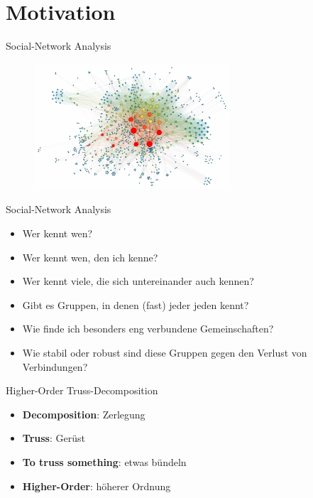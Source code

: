 \section*{Motivation}

\begin{frame}{Social-Network Analysis}
    \begin{figure}[h]
        \centering
        \includegraphics[width=0.65\textwidth]{imglib/social-network-analysis}\\
        \label{fig:social-network-analysis}
    \end{figure}
\end{frame}

\begin{frame}{Social-Network Analysis}
    \begin{itemize}
        \item Wer kennt wen?
        \item Wer kennt wen, den ich kenne?
        \item Wer kennt viele, die sich untereinander auch kennen?
        \item Gibt es Gruppen, in denen (fast) jeder jeden kennt?
        \item Wie finde ich besonders eng verbundene Gemeinschaften?
        \item Wie stabil oder robust sind diese Gruppen gegen den Verlust von Verbindungen?
    \end{itemize}
\end{frame}

\begin{frame}{Higher-Order Truss-Decomposition}
    \begin{itemize}
        \item \textbf{Decomposition}: Zerlegung
        \item \textbf{Truss}: Gerüst
        \item \textbf{To truss something}: etwas bündeln
        \item \textbf{Higher-Order}: höherer Ordnung
    \end{itemize}
\end{frame}
